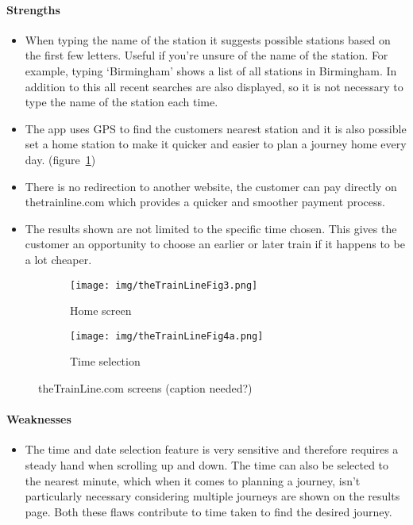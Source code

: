 \paragraph{Strengths}

\begin{itemize}
	\item When typing the name of the station it suggests possible stations
		based on the first few letters. Useful if you're unsure of the name of
		the station. For example, typing `Birmingham' shows a list of all
		stations in Birmingham. In addition to this all recent searches are
		also displayed, so it is not necessary to type the name of the station
		each time.
	\item The app uses GPS to find the customers nearest station and it is also
		possible set a home station to make it quicker and easier to plan a
		journey home every day. (figure~\ref{fig:thetrainline3})
	\item There is no redirection to another website, the customer can pay
		directly on thetrainline.com which provides a quicker and smoother
		payment process.
	\item The results shown are not limited to the specific time chosen. This
		gives the customer an opportunity to choose an earlier or later train
		if it happens to be a lot cheaper.
\end{itemize}

\begin{figure}[ht]
    \centering
    \begin{subfigure}[b]{0.2\textwidth}
        \texttt{[image: img/theTrainLineFig3.png]}
        \caption{Home screen}
    \end{subfigure}%
    \qquad
    \begin{subfigure}[b]{0.2\textwidth}
        \texttt{[image: img/theTrainLineFig4a.png]}
        \caption{Time selection}
    \end{subfigure}
    \caption{theTrainLine.com screens (caption needed?)}\label{fig:thetrainline3}
\end{figure}


\paragraph{Weaknesses}

\begin{itemize}
	\item The time and date selection feature is very sensitive and therefore
		requires a steady hand when scrolling up and down. The time can also be
		selected to the nearest minute, which when it comes to planning a
		journey, isn't particularly necessary considering multiple journeys are
		shown on the results page. Both these flaws contribute to time taken to
		find the desired journey.
\end{itemize}

